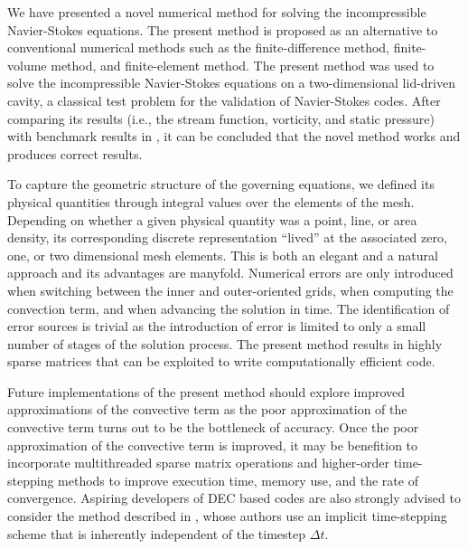 We have presented a novel numerical method for solving the incompressible Navier-Stokes equations. The present method is proposed as an alternative to conventional numerical methods such as the finite-difference method, finite-volume method, and finite-element method. The present method was used to solve the incompressible Navier-Stokes equations on a two-dimensional lid-driven cavity, a classical test problem for the validation of Navier-Stokes codes. After comparing its results (i.e., the stream function, vorticity, and static pressure) with benchmark results in \parencite{botella1998benchmark}, it can be concluded that the novel method works and produces correct results.

To capture the geometric structure of the governing equations, we defined its physical quantities through integral values over the elements of the mesh. Depending on whether a given physical quantity was a point, line, or area density, its corresponding discrete representation “lived” at the associated zero, one, or two dimensional mesh elements. This is both an elegant and a natural approach and its advantages are manyfold. Numerical errors are only introduced when switching between the inner and outer-oriented grids, when computing the convection term, and when advancing the solution in time. The identification of error sources is trivial as the introduction of error is limited to only a small number of stages of the solution process. The present method results in highly sparse matrices that can be exploited to write computationally efficient code.

Future implementations of the present method should explore improved approximations of the convective term as the poor approximation of the convective term turns out to be the bottleneck of accuracy. Once the poor approximation of the convective term is improved, it may be benefition to incorporate multithreaded sparse matrix operations and higher-order time-stepping methods to improve execution time, memory use, and the rate of convergence. Aspiring developers of DEC based codes are also strongly advised to consider the method described in \parencite{elcott2005discrete}, whose authors use an implicit time-stepping scheme that is inherently independent of the timestep $\Delta t$.